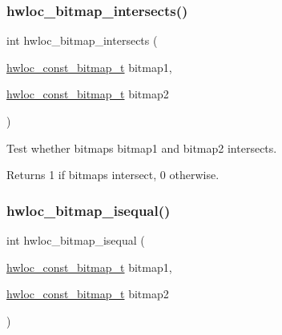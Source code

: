 \mbox{\label{a00205_gaefa070f9232857ba5a57297ea9a08ea2}} 
\subsubsection{\texorpdfstring{hwloc\+\_\+bitmap\+\_\+intersects()}{hwloc\_bitmap\_intersects()}}
{\footnotesize\ttfamily int hwloc\+\_\+bitmap\+\_\+intersects (\begin{DoxyParamCaption}\item[{\hyperlink{a00205_gae991a108af01d408be2776c5b2c467b2}{hwloc\+\_\+const\+\_\+bitmap\+\_\+t}}]{bitmap1,  }\item[{\hyperlink{a00205_gae991a108af01d408be2776c5b2c467b2}{hwloc\+\_\+const\+\_\+bitmap\+\_\+t}}]{bitmap2 }\end{DoxyParamCaption})}



Test whether bitmaps {\ttfamily bitmap1} and {\ttfamily bitmap2} intersects. 

\begin{DoxyReturn}{Returns}
1 if bitmaps intersect, 0 otherwise. 
\end{DoxyReturn}
\mbox{\label{a00205_ga32376b1405e57472b73c3aa53bb39663}} 
\subsubsection{\texorpdfstring{hwloc\+\_\+bitmap\+\_\+isequal()}{hwloc\_bitmap\_isequal()}}
{\footnotesize\ttfamily int hwloc\+\_\+bitmap\+\_\+isequal (\begin{DoxyParamCaption}\item[{\hyperlink{a00205_gae991a108af01d408be2776c5b2c467b2}{hwloc\+\_\+const\+\_\+bitmap\+\_\+t}}]{bitmap1,  }\item[{\hyperlink{a00205_gae991a108af01d408be2776c5b2c467b2}{hwloc\+\_\+const\+\_\+bitmap\+\_\+t}}]{bitmap2 }\end{DoxyParamCaption})}



